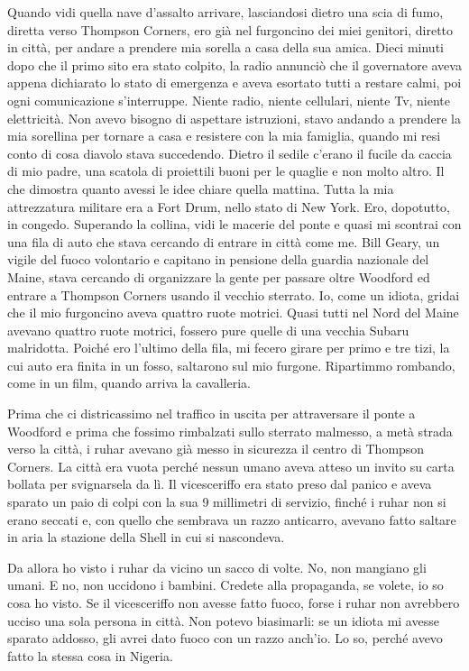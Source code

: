 Quando vidi quella nave d'assalto arrivare, lasciandosi dietro una scia
di fumo, diretta verso Thompson Corners, ero già nel furgoncino dei miei
genitori, diretto in città, per andare a prendere mia sorella a casa
della sua amica. Dieci minuti dopo che il primo sito era stato colpito,
la radio annunciò che il governatore aveva appena dichiarato lo stato di
emergenza e aveva esortato tutti a restare calmi, poi ogni comunicazione
s'interruppe. Niente radio, niente cellulari, niente Tv, niente
elettricità. Non avevo bisogno di aspettare istruzioni, stavo andando a
prendere la mia sorellina per tornare a casa e resistere con la mia
famiglia, quando mi resi conto di cosa diavolo stava succedendo. Dietro
il sedile c'erano il fucile da caccia di mio padre, una scatola di
proiettili buoni per le quaglie e non molto altro. Il che dimostra
quanto avessi le idee chiare quella mattina. Tutta la mia attrezzatura
militare era a Fort Drum, nello stato di New York. Ero, dopotutto, in
congedo. Superando la collina, vidi le macerie del ponte e quasi mi
scontrai con una fila di auto che stava cercando di entrare in città
come me. Bill Geary, un vigile del fuoco volontario e capitano in
pensione della guardia nazionale del Maine, stava cercando di
organizzare la gente per passare oltre Woodford ed entrare a Thompson
Corners usando il vecchio sterrato. Io, come un idiota, gridai che il
mio furgoncino aveva quattro ruote motrici. Quasi tutti nel Nord del
Maine avevano quattro ruote motrici, fossero pure quelle di una vecchia
Subaru malridotta. Poiché ero l'ultimo della fila, mi fecero girare per
primo e tre tizi, la cui auto era finita in un fosso, saltarono sul mio
furgone. Ripartimmo rombando, come in un film, quando arriva la
cavalleria.

Prima che ci districassimo nel traffico in uscita per attraversare il
ponte a Woodford e prima che fossimo rimbalzati sullo sterrato malmesso,
a metà strada verso la città, i ruhar avevano già messo in sicurezza il
centro di Thompson Corners. La città era vuota perché nessun umano aveva
atteso un invito su carta bollata per svignarsela da lì. Il vicesceriffo
era stato preso dal panico e aveva sparato un paio di colpi con la sua 9
millimetri di servizio, finché i ruhar non si erano seccati e, con
quello che sembrava un razzo anticarro, avevano fatto saltare in aria la
stazione della Shell in cui si nascondeva.

Da allora ho visto i ruhar da vicino un sacco di volte. No, non mangiano
gli umani. E no, non uccidono i bambini. Credete alla propaganda, se
volete, io so cosa ho visto. Se il vicesceriffo non avesse fatto fuoco,
forse i ruhar non avrebbero ucciso una sola persona in città. Non potevo
biasimarli: se un idiota mi avesse sparato addosso, gli avrei dato fuoco
con un razzo anch'io. Lo so, perché avevo fatto la stessa cosa in
Nigeria.

